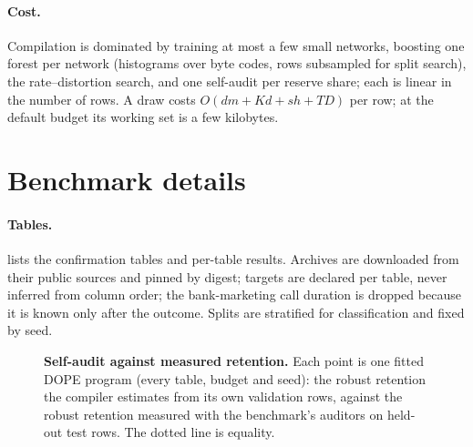 \documentclass[10pt,letterpaper]{article}
\begin{document}
\begin{table}[h]
\centering
\caption{\textbf{Sampling throughput} of programs compiled from four confirmation tables. Bytes is the
file; inflated is the program container before compression, of which metadata is the schema and
structure.}
\label{tab:throughput}
\small
{}
\end{table}

\paragraph{Cost.} Compilation is dominated by training at most a few small networks, boosting one
forest per network (histograms over byte codes, rows subsampled for split search), the
rate--distortion search, and one self-audit per reserve share; each is linear in the number of rows.
A draw costs $O(dm+Kd+sh+TD)$ per row; at the default budget its working set is a few kilobytes.

\section{Benchmark details}
\label{app:bench}

\paragraph{Tables.}  lists the confirmation tables and per-table results. Archives
are downloaded from their public sources and pinned by digest; targets are declared per table, never
inferred from column order; the bank-marketing call duration is dropped because it is known only after
the outcome. Splits are stratified for classification and fixed by seed.

\begin{table}[h]
\centering
\caption{\textbf{Per-table results} at the default budget: robust retention (median over seeds) of DOPE
(\texttt{\G{ReleaseTag}}), of real rows xz-compressed to the same budget, and of the generators at default
size, with DOPE's TDL at
$\tau=\CfgTau$ (n.r.: not reached on the tested grid).}
\label{tab:pertable}
\small
{}
\end{table}

\begin{figure}[h]
\centering
{}
\caption{\textbf{Self-audit against measured retention.} Each point is one fitted DOPE program (every
table, budget and seed): the robust retention the compiler estimates from its own validation rows,
against the robust retention measured with the benchmark's auditors on held-out test rows. The dotted
line is equality.}
\label{fig:audit}
\end{figure}
\end{document}
